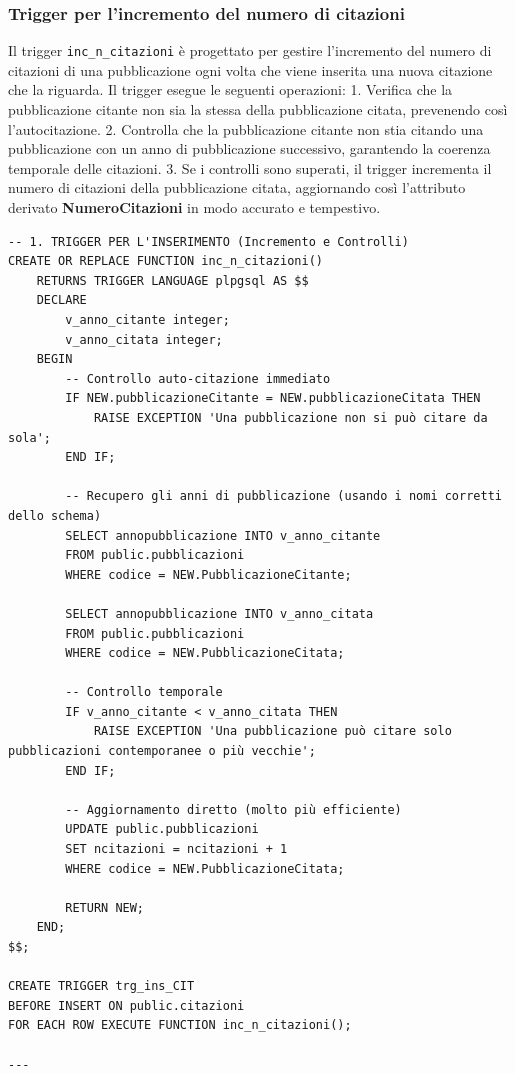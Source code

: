 \documentclass[a4paper,12pt]{article}
\begin{document}
\subsubsection{Trigger per l'incremento del numero di citazioni}
Il trigger \texttt{inc\_n\_citazioni} è progettato per gestire l'incremento del numero di citazioni di una pubblicazione ogni volta che viene inserita una nuova citazione che la riguarda. Il trigger esegue le seguenti operazioni:
1. Verifica che la pubblicazione citante non sia la stessa della pubblicazione citata, prevenendo così l'autocitazione.
2. Controlla che la pubblicazione citante non stia citando una pubblicazione
con un anno di pubblicazione successivo, garantendo la coerenza temporale delle citazioni.
3. Se i controlli sono superati, il trigger incrementa il numero di citazioni
della pubblicazione citata, aggiornando così l'attributo derivato \textbf{NumeroCitazioni} in modo accurato e tempestivo.\\
\begin{lstlisting}
-- 1. TRIGGER PER L'INSERIMENTO (Incremento e Controlli)
CREATE OR REPLACE FUNCTION inc_n_citazioni()
    RETURNS TRIGGER LANGUAGE plpgsql AS $$
    DECLARE
        v_anno_citante integer;
        v_anno_citata integer;
    BEGIN
        -- Controllo auto-citazione immediato
        IF NEW.pubblicazioneCitante = NEW.pubblicazioneCitata THEN
            RAISE EXCEPTION 'Una pubblicazione non si può citare da sola';
        END IF;

        -- Recupero gli anni di pubblicazione (usando i nomi corretti dello schema)
        SELECT annopubblicazione INTO v_anno_citante 
        FROM public.pubblicazioni 
        WHERE codice = NEW.PubblicazioneCitante;

        SELECT annopubblicazione INTO v_anno_citata 
        FROM public.pubblicazioni 
        WHERE codice = NEW.PubblicazioneCitata;

        -- Controllo temporale
        IF v_anno_citante < v_anno_citata THEN
            RAISE EXCEPTION 'Una pubblicazione può citare solo pubblicazioni contemporanee o più vecchie';
        END IF;

        -- Aggiornamento diretto (molto più efficiente)
        UPDATE public.pubblicazioni
        SET ncitazioni = ncitazioni + 1
        WHERE codice = NEW.PubblicazioneCitata;

        RETURN NEW;
    END;
$$;

CREATE TRIGGER trg_ins_CIT
BEFORE INSERT ON public.citazioni
FOR EACH ROW EXECUTE FUNCTION inc_n_citazioni();

---

\end{lstlisting}
\end{document}
